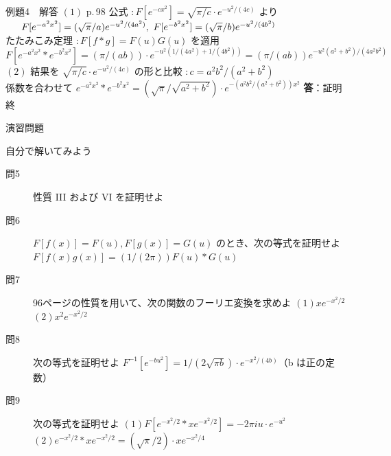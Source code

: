 \documentclass[professionalfonts]{beamer}
\begin{document}
\begin{frame}{例題4　解答}
  $(1)$ p.\,98 公式 $: F[e^{-cx^{2}}] = \sqrt{\pi/c}\cdot e^{-u^{2}/(4c)}$ より\\[4pt]
  $\hphantom{(1)\ }F[e^{-a^{2}x^{2}}] = (\sqrt{\pi}/a)e^{-u^{2}/(4a^{2})},\ F[e^{-b^{2}x^{2}}] = (\sqrt{\pi}/b)e^{-u^{2}/(4b^{2})}$\\[4pt]
  たたみこみ定理 $: F[f*g] = F(u)G(u)$ を適用\\[4pt]
  $F[e^{-a^{2}x^{2}} * e^{-b^{2}x^{2}}] = (\pi/(ab))\cdot e^{-u^{2}(1/(4a^{2})+1/(4b^{2}))} = (\pi/(ab))e^{-u^{2}(a^{2}+b^{2})/(4a^{2}b^{2})}$\\[4pt]
  $(2)$ 結果を $\sqrt{\pi/c}\cdot e^{-u^{2}/(4c)}$ の形と比較 $: c = a^{2}b^{2}/(a^{2}+b^{2})$\\[4pt]
  係数を合わせて $e^{-a^{2}x^{2}}*e^{-b^{2}x^{2}} = (\sqrt{\pi}/\sqrt{a^{2}+b^{2}})\cdot e^{-(a^{2}b^{2}/(a^{2}+b^{2}))x^{2}}$
  \medskip\textbf{答}：証明終
\end{frame}

\begin{frame}{演習問題}
  \begin{exampleblock}{自分で解いてみよう}
  \begin{description}
    \item[問5] 性質 III および VI を証明せよ
    \item[問6] $F[f(x)] = F(u), F[g(x)] = G(u)$ のとき、次の等式を証明せよ
    $F[f(x)g(x)] = (1/(2\pi)) F(u) * G(u)$\\
    \item[問7] 96ページの性質を用いて、次の関数のフーリエ変換を求めよ
    $(1) xe^{-x^{2}/2}$\\
    $(2) x^{2}e^{-x^{2}/2}$\\
    \item[問8] 次の等式を証明せよ
    $F^{-1}[e^{-bu^{2}}] = 1/(2\sqrt{\pi b}) \cdot e^{-x^{2}/(4b)}$（b は正の定数）\\
    \item[問9] 次の等式を証明せよ
    $(1) F[e^{-x^{2}/2} * xe^{-x^{2}/2}] = -2\pi iu\cdot e^{-u^{2}}$\\
    $(2) e^{-x^{2}/2} * xe^{-x^{2}/2} = (\sqrt{\pi}/2)\cdot xe^{-x^{2}/4}$\\
  \end{description}
  \end{exampleblock}
\end{frame}
\end{document}
